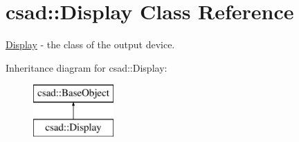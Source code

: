 \hypertarget{classcsad_1_1_display}{\section{csad\-:\-:Display Class Reference}
\label{classcsad_1_1_display}
}


\hyperlink{classcsad_1_1_display}{Display} -\/ the class of the output device.  


Inheritance diagram for csad\-:\-:Display\-:\begin{figure}[H]
\begin{center}
\leavevmode
\includegraphics[height=2.000000cm]{classcsad_1_1_display}
\end{center}
\end{figure}
